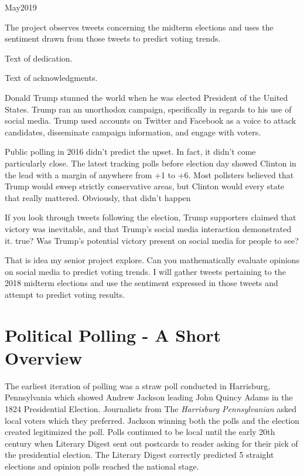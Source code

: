 \documentclass[11pt, twoside, reqno]{book}
\begin{document}
    {May}{2019}

\abstr

The project observes tweets concerning the midterm elections and uses the sentiment drawn from those tweets to predict voting trends.

\tableofcontents

\dedic

Text of dedication.

\acknowl

Text of acknowledgments.

\startmain


\intro
\hspace{0.2in}Donald Trump stunned the world when he was elected President of the United States. Trump ran an unorthodox campaign, specifically in regards to his use of social media. Trump used accounts on Twitter and Facebook as a voice to attack candidates, disseminate campaign information, and engage with voters. 

Public polling in 2016 didn’t predict the upset. In fact, it didn’t come particularly close. The latest tracking polls before election day showed Clinton in the lead with a margin of anywhere from +1 to +6. Most pollsters believed that Trump would sweep strictly conservative areas, but Clinton would every state that really mattered. Obviously, that didn’t happen

If you look through tweets following the election, Trump supporters claimed that victory was inevitable, and that Trump’s social media interaction demonstrated it. true? Was Trump’s potential victory present on social media for people to see? 

That is idea my senior project explore. Can you mathematically evaluate opinions on social media to predict voting trends. I will gather tweets pertaining to the 2018 midterm elections and use the sentiment expressed in those tweets and attempt to predict voting results. 


\section{Political Polling - A Short Overview}
\hspace{0.2in} The earliest iteration of polling was a straw poll conducted in Harrisburg, Pennsylvania which showed Andrew Jackson leading John Quincy Adams in the 1824 Presidential Election. Journalists from The \textit{Harrisburg Pennsylvanian} asked local voters which they preferred. Jackson winning both the polls and the election created legitimized the poll. Polls continued to be local until the early 20th century when Literary Digest sent out postcards to reader asking for their pick of the presidential election. The Literary Digest correctly predicted 5 straight elections and opinion polls reached the national stage. 
\end{document}
